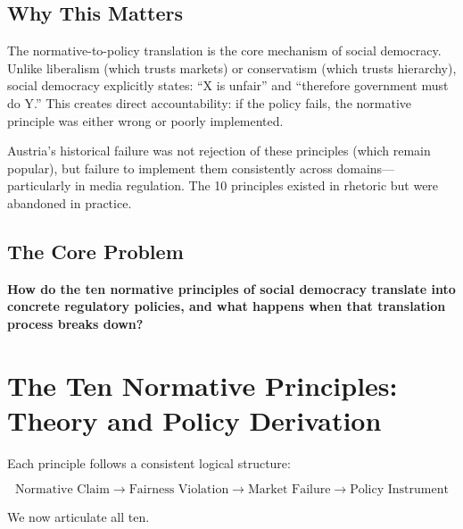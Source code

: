 \subsection{Why This Matters}

The normative-to-policy translation is the core mechanism of social democracy. Unlike liberalism (which trusts markets) or conservatism (which trusts hierarchy), social democracy explicitly states: ``X is unfair'' and ``therefore government must do Y.'' This creates direct accountability: if the policy fails, the normative principle was either wrong or poorly implemented.

Austria's historical failure was not rejection of these principles (which remain popular), but failure to implement them consistently across domains---particularly in media regulation. The 10 principles existed in rhetoric but were abandoned in practice.

\subsection{The Core Problem}

\begin{tcolorbox}[colback=red!5!white, colframe=red!75!black,
    title=The Fundamental Question]

\textbf{How do the ten normative principles of social democracy translate into concrete regulatory policies, and what happens when that translation process breaks down?}

\end{tcolorbox}


\section{The Ten Normative Principles: Theory and Policy Derivation}
\label{sec:bf-theory}

Each principle follows a consistent logical structure:

\begin{equation}
\text{Normative Claim} \rightarrow \text{Fairness Violation} \rightarrow \text{Market Failure} \rightarrow \text{Policy Instrument}
\end{equation}

We now articulate all ten.

